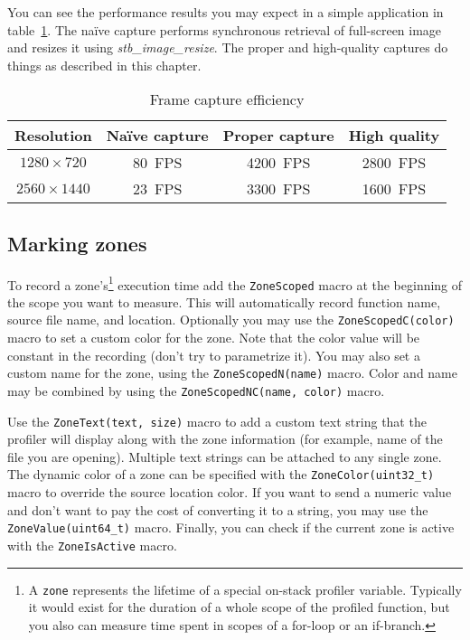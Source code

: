\documentclass[hidelinks,titlepage,a4paper,twoside]{article}
\begin{document}
You can see the performance results you may expect in a simple application in table~\ref{asynccapture}. The na\"ive capture performs synchronous retrieval of full-screen image and resizes it using \emph{stb\_image\_resize}. The proper and high-quality captures do things as described in this chapter.

\begin{table}[h]
\centering
\begin{tabular}[h]{c|c|c|c}
\textbf{Resolution} & \textbf{Na\"ive capture} & \textbf{Proper capture} & \textbf{High quality} \\ \hline
$1280\times720$ & 80~FPS & 4200~FPS & 2800~FPS \\
$2560\times1440$ & 23~FPS & 3300~FPS & 1600~FPS
\end{tabular}
\caption{Frame capture efficiency}
\label{asynccapture}
\end{table}

\subsection{Marking zones}
\label{markingzones}

To record a zone's\footnote{A \texttt{zone} represents the lifetime of a special on-stack profiler variable. Typically it would exist for the duration of a whole scope of the profiled function, but you also can measure time spent in scopes of a for-loop or an if-branch.} execution time add the \texttt{ZoneScoped} macro at the beginning of the scope you want to measure. This will automatically record function name, source file name, and location. Optionally you may use the \texttt{ZoneScopedC(color)} macro to set a custom color for the zone. Note that the color value will be constant in the recording (don't try to parametrize it). You may also set a custom name for the zone, using the \texttt{ZoneScopedN(name)} macro. Color and name may be combined by using the \texttt{ZoneScopedNC(name, color)} macro.

Use the \texttt{ZoneText(text, size)} macro to add a custom text string that the profiler will display along with the zone information (for example, name of the file you are opening). Multiple text strings can be attached to any single zone. The dynamic color of a zone can be specified with the \texttt{ZoneColor(uint32\_t)} macro to override the source location color. If you want to send a numeric value and don't want to pay the cost of converting it to a string, you may use the \texttt{ZoneValue(uint64\_t)} macro. Finally, you can check if the current zone is active with the \texttt{ZoneIsActive} macro.
\end{document}
